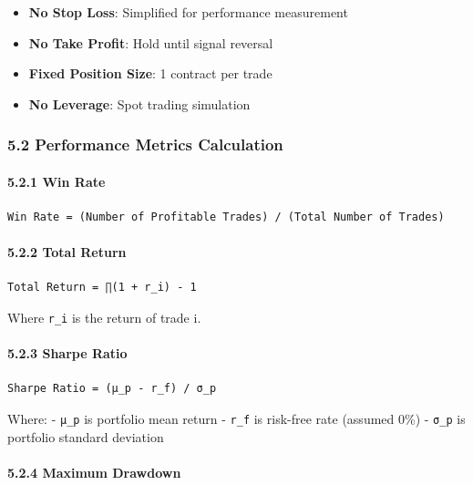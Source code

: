\begin{itemize}
\tightlist
\item
  \textbf{No Stop Loss}: Simplified for performance measurement
\item
  \textbf{No Take Profit}: Hold until signal reversal
\item
  \textbf{Fixed Position Size}: 1 contract per trade
\item
  \textbf{No Leverage}: Spot trading simulation
\end{itemize}

\subsubsection{5.2 Performance Metrics
Calculation}\label{performance-metrics-calculation}

\paragraph{5.2.1 Win Rate}\label{win-rate}

\begin{verbatim}
Win Rate = (Number of Profitable Trades) / (Total Number of Trades)
\end{verbatim}

\paragraph{5.2.2 Total Return}\label{total-return}

\begin{verbatim}
Total Return = ∏(1 + r_i) - 1
\end{verbatim}

Where \texttt{r\_i} is the return of trade i.

\paragraph{5.2.3 Sharpe Ratio}\label{sharpe-ratio}

\begin{verbatim}
Sharpe Ratio = (μ_p - r_f) / σ_p
\end{verbatim}

Where: - \texttt{μ\_p} is portfolio mean return - \texttt{r\_f} is
risk-free rate (assumed 0\%) - \texttt{σ\_p} is portfolio standard
deviation

\paragraph{5.2.4 Maximum Drawdown}\label{maximum-drawdown}

